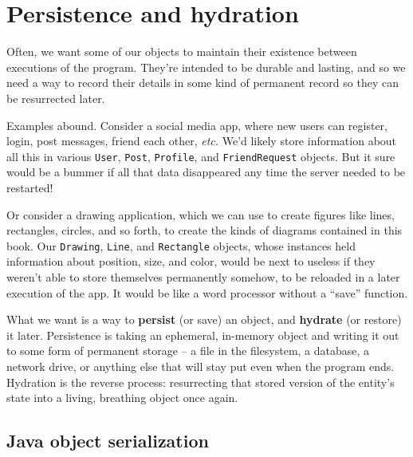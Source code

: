 
\chapter{Persistence and hydration}

Often, we want some of our objects to maintain their existence between
executions of the program. They're intended to be durable and lasting, and so
we need a way to record their details in some kind of permanent record so they
can be resurrected later.

Examples abound. Consider a social media app, where new users can register,
login, post messages, friend each other, \textit{etc.} We'd likely store
information about all this in various \texttt{User}, \texttt{Post},
\texttt{Profile}, and \texttt{FriendRequest} objects. But it sure would be a
bummer if all that data disappeared any time the server needed to be
restarted!

Or consider a drawing application, which we can use to create figures like
lines, rectangles, circles, and so forth, to create the kinds of diagrams
contained in this book. Our \texttt{Drawing}, \texttt{Line}, and
\texttt{Rectangle} objects, whose instances held information about position,
size, and color, would be next to useless if they weren't able to store
themselves permanently somehow, to be reloaded in a later execution of the
app. It would be like a word processor without a ``save'' function.

What we want is a way to \textbf{persist} (or save) an object, and
\textbf{hydrate} (or restore) it later. Persistence is taking an ephemeral,
in-memory object and writing it out to some form of permanent storage -- a
file in the filesystem, a database, a network drive, or anything else that
will stay put even when the program ends. Hydration is the reverse process:
resurrecting that stored version of the entity's state into a living,
breathing object once again.

\section{Java object serialization}


